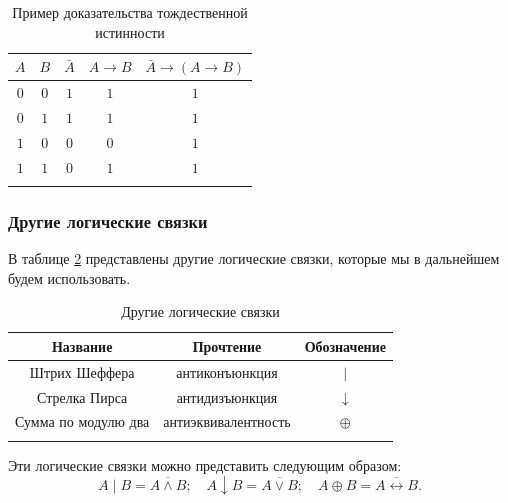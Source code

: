 \documentclass[a5paper, 11pt]{extarticle}
\theoremstyle{definition}
\theoremstyle{definition}
\theoremstyle{definition}
\numberwithin{figure}{section}
\numberwithin{table}{section}
\begin{document}
\begin{table}[H]
    \renewcommand*{\arraystretch}{1.5}
    \begin{longtable}{|c|c|c|c|c|}
        \hline
        \(A\) & \(B\) & \(\bar{A}\) & \(A \to B\) & \(\bar{A} \to (A \to B)\) \\
        \hline
        \(0\) & \(0\) & \(1\)       & \(1\)       & \(1\)                     \\
        \hline
        \(0\) & \(1\) & \(1\)       & \(1\)       & \(1\)                     \\
        \hline
        \(1\) & \(0\) & \(0\)       & \(0\)       & \(1\)                     \\
        \hline
        \(1\) & \(1\) & \(0\)       & \(1\)       & \(1\)                     \\
        \hline
        \caption{Пример доказательства тождественной истинности}
    \end{longtable}
\end{table}

\subsubsection{Другие логические связки}

В таблице \ref{tab:other-logical-connectives} представлены другие логические связки, которые мы в дальнейшем будем использовать.

\begin{table}[H]
    \renewcommand*{\arraystretch}{1.5}
    \begin{longtable}{|c|c|c|}
        \hline
        \textbf{Название}   & \textbf{Прочтение}  & \textbf{Обозначение} \\
        \hline
        Штрих Шеффера       & антиконъюнкция      & \(|\)                \\
        \hline
        Стрелка Пирса       & антидизъюнкция      & \(\downarrow\)       \\
        \hline
        Сумма по модулю два & антиэквивалентность & \(\oplus\)           \\
        \hline
        \caption{Другие логические связки}
        \label{tab:other-logical-connectives}
    \end{longtable}
\end{table}

Эти логические связки можно представить следующим образом:
\[
    A \mathop{|} B = \overline{A \land B};
    \quad
    A \downarrow B = \overline{A \lor B};
    \quad
    A \oplus B = \overline{A \leftrightarrow B}.
\]
\end{document}
